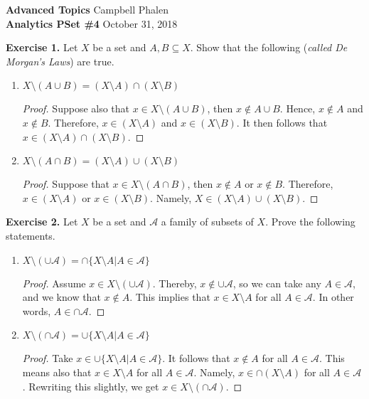 \documentclass[11pt, leqno]{article}
\begin{document}
{\bfseries Advanced Topics} \hspace*{\fill} Campbell Phalen \\
{\bfseries Analytics PSet \#4} \hspace*{\fill}October 31, 2018
\vspace{1pc}

\hrulefill
\vspace{1pc}
	

{\bfseries Exercise 1.} Let $X$ be a set and $A, B \subseteq X$. Show that the following (\textit{called De Morgan's Laws}) are true.
\begin{enumerate}[label=(\alph*)]
	\item $X \setminus (A \cup B) = (X \setminus A) \cap (X \setminus B)$
	
	\begin{proof}
	Suppose also that $x \in X \setminus (A \cup B)$, then $x \notin A \cup B$. Hence, $x \notin A$ and $x \notin B$. Therefore, $x \in (X \setminus A)$ and $x \in (X \setminus B)$. It then follows that $x \in (X \setminus A) \cap (X \setminus B)$.
	\end{proof}
	
	\item $X \setminus (A \cap B) = (X \setminus A) \cup (X \setminus B)$
	
	\begin{proof}
	Suppose that $x \in X \setminus (A \cap B)$, then $x \notin A$ or $x \notin B$. Therefore, $x \in (X \setminus A)$ or $x \in (X \setminus B)$. Namely, $X \in (X \setminus A) \cup (X \setminus B)$.
	\end{proof}
\end{enumerate}

{\bfseries Exercise 2.} Let $X$ be a set and $\mathcal{A}$ a family of subsets of $X$. Prove the following statements.
\begin{enumerate}[label=(\alph*)]
	\item $X \setminus (\cup \mathcal{A}) = \cap \{X \setminus A | A \in \mathcal{A}\}$
	
	\begin{proof}
	Assume $x \in X \setminus (\cup \mathcal{A})$. Thereby, $x \notin \cup \mathcal{A}$, so we can take any $A \in \mathcal{A}$, and we know that $x \notin A$. This implies that $x \in X \setminus A$ for all $A \in \mathcal{A}$. In other words, $A \in \cap \mathcal{A}$. 
	\end{proof}
	
	\item $X \setminus (\cap \mathcal{A}) = \cup \{X \setminus A | A \in \mathcal{A}\}$
	
	\begin{proof}
	Take $x \in \cup \{X \setminus A | A \in \mathcal{A}\}$. It follows that $x \notin A$ for all $A \in \mathcal{A}$. This means also that $x \in X \setminus A$ for all $A \in \mathcal{A}$. Namely, $x \in \cap (X \setminus A)$ for all $A \in \mathcal{A}$. Rewriting this slightly, we get $x \in X \setminus (\cap \mathcal{A})$.
	\end{proof}
\end{enumerate}
\end{document}
